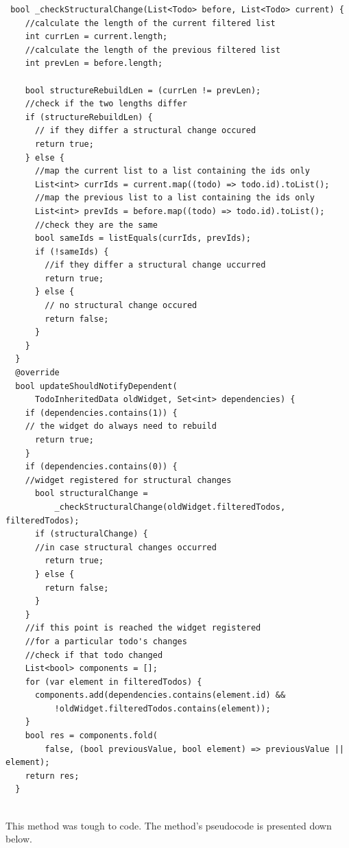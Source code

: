 \begin{code}
\mbox{}
\label{code:2.46}
\begin{verbatim}
 bool _checkStructuralChange(List<Todo> before, List<Todo> current) {
    //calculate the length of the current filtered list
    int currLen = current.length;
    //calculate the length of the previous filtered list
    int prevLen = before.length;

    bool structureRebuildLen = (currLen != prevLen);
    //check if the two lengths differ
    if (structureRebuildLen) {
      // if they differ a structural change occured
      return true;
    } else {
      //map the current list to a list containing the ids only
      List<int> currIds = current.map((todo) => todo.id).toList();
      //map the previous list to a list containing the ids only
      List<int> prevIds = before.map((todo) => todo.id).toList();
      //check they are the same
      bool sameIds = listEquals(currIds, prevIds);
      if (!sameIds) {
        //if they differ a structural change uccurred
        return true;
      } else {
        // no structural change occured
        return false;
      }
    }
  }
  @override
  bool updateShouldNotifyDependent(
      TodoInheritedData oldWidget, Set<int> dependencies) {
    if (dependencies.contains(1)) {
    // the widget do always need to rebuild
      return true;
    }
    if (dependencies.contains(0)) {
    //widget registered for structural changes
      bool structuralChange =
          _checkStructuralChange(oldWidget.filteredTodos, filteredTodos);
      if (structuralChange) {
      //in case structural changes occurred
        return true;
      } else {
        return false;
      }
    }
    //if this point is reached the widget registered    
    //for a particular todo's changes
    //check if that todo changed
    List<bool> components = [];
    for (var element in filteredTodos) {
      components.add(dependencies.contains(element.id) &&
          !oldWidget.filteredTodos.contains(element));
    }
    bool res = components.fold(
        false, (bool previousValue, bool element) => previousValue || element);
    return res;
  }
\end{verbatim}
\end{code}
\mbox{}\\
This method was tough to code. The method's pseudocode is presented down below. 
\mbox{}\\
